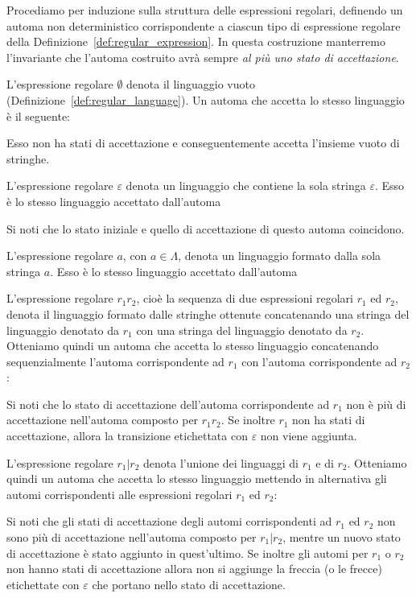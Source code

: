 Procediamo per induzione sulla struttura delle espressioni regolari, definendo
un automa non deterministico corrispondente a ciascun tipo di espressione
regolare della Definizione~\ref{def:regular_expression}. In questa costruzione
manterremo l'invariante che l'automa costruito avr\`a sempre
\emph{al pi\`u uno stato di accettazione}.

L'espressione regolare $\emptyset$ denota il linguaggio vuoto
(Definizione~\ref{def:regular_language}). Un automa che accetta lo
stesso linguaggio \`e il seguente:
%
\begin{center}
\end{center}
%
Esso non ha stati di accettazione e conseguentemente accetta
l'insieme vuoto di stringhe.

L'espressione regolare $\varepsilon$ denota un linguaggio che contiene la
sola stringa $\varepsilon$. Esso \`e lo stesso linguaggio accettato dall'automa
%
\begin{center}
\end{center}
%
Si noti che lo stato iniziale e quello di accettazione di questo automa
coincidono.

L'espressione regolare $a$, con $a\in\Lambda$, denota un linguaggio formato
dalla sola stringa $a$. Esso \`e lo stesso linguaggio accettato dall'automa
%
\begin{center}
\end{center}

L'espressione regolare $r_1r_2$, cio\`e la sequenza di due espressioni regolari
$r_1$ ed $r_2$, denota il linguaggio formato dalle stringhe ottenute
concatenando una stringa del linguaggio denotato da $r_1$ con una stringa
del linguaggio denotato da $r_2$. Otteniamo quindi un automa che accetta lo
stesso linguaggio concatenando sequenzialmente l'automa corrispondente ad
$r_1$ con l'automa corrispondente ad $r_2$:
%
\begin{center}
\end{center}
%
Si noti che lo stato di accettazione dell'automa corrispondente ad $r_1$
non \`e pi\`u di accettazione nell'automa composto per $r_1r_2$. Se inoltre
$r_1$ non ha stati di accettazione, allora la transizione etichettata con
$\varepsilon$ non viene aggiunta.

L'espressione regolare $r_1|r_2$ denota l'unione dei linguaggi di
$r_1$ e di $r_2$. Otteniamo quindi un automa che accetta lo stesso
linguaggio mettendo in alternativa gli automi corrispondenti alle
espressioni regolari $r_1$ ed $r_2$:
%
\begin{center}
\end{center}
%
Si noti che gli stati di accettazione degli automi corrispondenti ad $r_1$
ed $r_2$ non sono pi\`u di accettazione nell'automa composto per $r_1|r_2$,
mentre un nuovo stato di accettazione \`e stato aggiunto in quest'ultimo.
Se inoltre gli automi per $r_1$ o $r_2$ non hanno stati di accettazione
allora non si aggiunge la freccia (o le frecce) etichettate con
$\varepsilon$ che portano nello stato di accettazione.

